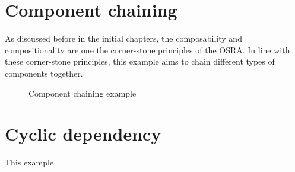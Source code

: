 \section{Component chaining}
As discussed before in the initial chapters, the composability and compositionality are one the corner-stone principles of the OSRA. In line with these corner-stone principles, this example aims to chain different types of components together.

\begin{figure}[h]
	\centering
	\hfill
	\hfill
	\caption{Component chaining example}
\end{figure}

\section{Cyclic dependency}
This example 



 




   
 